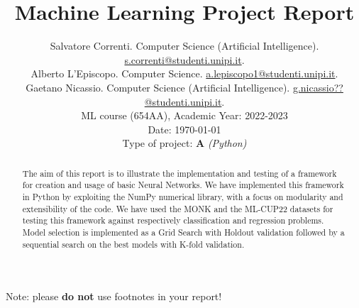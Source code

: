 \documentclass[12pt, letterpaper]{article}  %
\title{\vspace{-2cm}\textbf{Machine Learning Project Report}}
\author{\small{Salvatore Correnti.}
        \small{Computer Science (Artificial Intelligence). \underline{s.correnti@studenti.unipi.it}.} \\ \small{Alberto L'Episcopo.}
        \small{Computer Science. \underline{a.lepiscopo1@studenti.unipi.it}.} \\\small{Gaetano Nicassio.}
        \small{Computer Science (Artificial Intelligence). \underline{g.nicassio??@studenti.unipi.it}.} \\  %
        \small{ML course (654AA), Academic Year: 2022-2023} \\
        \small{Date: \today} \\
        \small{Type of project: \textbf{A} \textit{(Python)}}
}
\begin{document}
\nocite{*}  %
\date{}
\maketitle

\begin{abstract}
  The aim of this report is to illustrate the implementation and testing of a framework for creation and usage of basic Neural Networks.
  We have implemented this framework in Python by exploiting the NumPy numerical library, with a focus on modularity and extensibility of the code.
  We have used the MONK and the ML-CUP22 datasets for testing this framework against respectively classification and regression problems.
  Model selection is implemented as a Grid Search with Holdout validation followed by a sequential search on the best models with K-fold validation.
\end{abstract}





\noindent Note: please \textbf{do not} use footnotes in your report!
\end{document}
